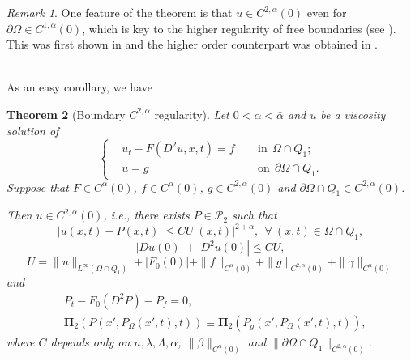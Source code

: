 \documentclass[preprint,12pt]{elsarticle}
\newtheorem{theorem}{Theorem}[section]
\theoremstyle{definition}
\theoremstyle{remark}
\newtheorem{remark}[theorem]{Remark}
\numberwithin{equation}{section}
\begin{document}
\begin{remark}\label{re1.5}
One feature of the theorem is that $u\in C^{2,\alpha}(0)$ even for $\partial \Omega\in C^{1,\alpha}(0)$, which is key to the higher regularity of free boundaries (see ). This was first shown in \cite{MR4088470} and the higher order counterpart was obtained in \cite{freeboundary}.
\end{remark}
~\\

As an easy corollary, we have
\begin{theorem}[Boundary $C^{2,\alpha}$ regularity]\label{C2a}
Let $0<\alpha<\bar\alpha$ and $u$ be a viscosity solution of
  \begin{equation}\label{e.C2a.u}
\left\{\begin{aligned}
&u_t-F(D^2u,x,t)=f&& ~~\mbox{in}~~\Omega\cap Q_1;\\
&u=g&& ~~\mbox{on}~~\partial \Omega \cap Q_1.
\end{aligned}\right.
\end{equation}
Suppose that $F\in C^{\alpha}(0)$, $f\in C^{\alpha}(0)$, $g\in C^{2,\alpha}(0)$ and $\partial \Omega\cap Q_1 \in C^{2,\alpha}(0)$.

Then $u\in C^{2,\alpha}(0)$, i.e., there exists $P\in \mathcal{P}_2$ such that
\begin{equation}\label{e.C2a}
|u(x,t)-P(x,t)|\leq CU|(x,t)|^{2+\alpha},~~\forall~(x,t)\in \Omega \cap Q_{1},
\end{equation}
\begin{equation}\label{e.C2a.2}
  |Du(0)|+|D^2u(0)| \leq CU,
\end{equation}
\begin{equation*}
U=\|u\|_{L^{\infty}(\Omega\cap Q_1)}+|F_0(0)|+
\|f\|_{C^{\alpha}(0)}+\|g\|_{C^{2,\alpha}(0)}
+\|\gamma\|_{C^{\alpha}(0)}
\end{equation*}
and
\begin{equation}\label{e.C2a.3}
\begin{aligned}
&P_t-F_0(D^2 P)-P_f=0,\\
&\mathbf{\Pi}_{2}\left(P(x',P_{\Omega}(x',t),t)\right)\equiv
\mathbf{\Pi}_{2}\left(P_g(x',P_{\Omega}(x',t),t)\right),
\end{aligned}
\end{equation}
where $C$ depends only on $n, \lambda,\Lambda,\alpha$, $\|\beta\|_{C^{\alpha}(0)}$ and $\|\partial \Omega\cap Q_1\|_{C^{2,\alpha}(0)}$.
\end{theorem}

\end{document}
